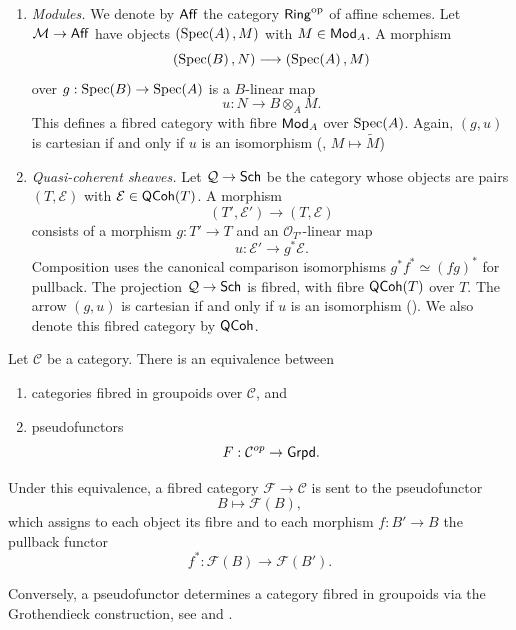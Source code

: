 \begin{example}\label{ex:fibred-categories}
	\leavevmode
	\begin{enumerate}
		\item \emph{Modules.}
		We denote by $\mathsf{Aff}$ the category $\mathsf{Ring}^{\mathrm{op}}$ of affine schemes.
		Let $\mathcal{M}\to\mathsf{Aff}$ have objects $(\operatorname{Spec}\!\left(A\right), M)$ with $M\in\mathsf{Mod}_A$.
		A morphism
		\[
		(\operatorname{Spec}\!\left(B\right), N)\longrightarrow(\operatorname{Spec}\!\left(A\right), M)
		\]
		over $g:\operatorname{Spec}\!\left(B\right)\to\operatorname{Spec}\!\left(A\right)$ is a
		$B$-linear map
		\[
		u:N\longrightarrow B\otimes_A M.
		\]
		This defines a fibred category with fibre
		$\mathsf{Mod}_A$ over $\operatorname{Spec}\!\left(A\right)$.
		Again, $(g, u)$ is cartesian if and only if
		$u$ is an isomorphism (\cite[][Tags 01IB, 01I9]{stacks-project}, $M\mapsto\widetilde{M}$)
		
		\item \emph{Quasi-coherent sheaves.}
		Let $\mathcal{Q}\to\mathsf{Sch}$ be the category whose objects
		are pairs $(T, \mathcal{E})$ with
		$\mathcal{E}\in\mathsf{QCoh}(T)$.
		A morphism
		\[
		(T', \mathcal{E}')\longrightarrow(T, \mathcal{E})
		\]
		consists of a morphism $g:T'\to T$ and an
		$\mathcal{O}_{T'}$-linear map
		\[
		u:\mathcal{E}'\longrightarrow g^*\mathcal{E}.
		\]
		Composition uses the canonical comparison
		isomorphisms $g^*f^* \simeq (fg)^*$ for pullback.
		The projection $\mathcal{Q}\to\mathsf{Sch}$ is fibred,
		with fibre $\mathsf{QCoh}(T)$ over $T$.
		The arrow $(g,u)$ is cartesian if and only if
		$u$ is an isomorphism (\cite[][Section~3.2]{vistoli2007notes}). 
		We also denote this fibred category by $\mathsf{QCoh}$.
	\end{enumerate}
\end{example}

\begin{proposition}\label{prop:grothendieck-construction}
	Let $\mathcal{C}$ be a category. There is an equivalence between
	\begin{enumerate}
		\item categories fibred in groupoids over $\mathcal{C}$, and
		\item pseudofunctors
		\[
		F : \mathcal{C}^{op} \to \mathsf{Grpd}.
		\]
	\end{enumerate}
	
	Under this equivalence, a fibred category $\mathcal{F} \to \mathcal{C}$
	is sent to the pseudofunctor
	\[
	B \longmapsto \mathcal{F}(B),
	\]
	which assigns to each object its fibre and to each morphism
	$f : B' \to B$ the pullback functor
	\[
	f^* : \mathcal{F}(B) \to \mathcal{F}(B').
	\]
	
	Conversely, a pseudofunctor determines a category fibred in groupoids
	via the Grothendieck construction, see \cite[][Section~3.1.2]{vistoli2007notes} and
	\cite[][Tags 02XJ, 003S]{stacks-project}.
\end{proposition}

